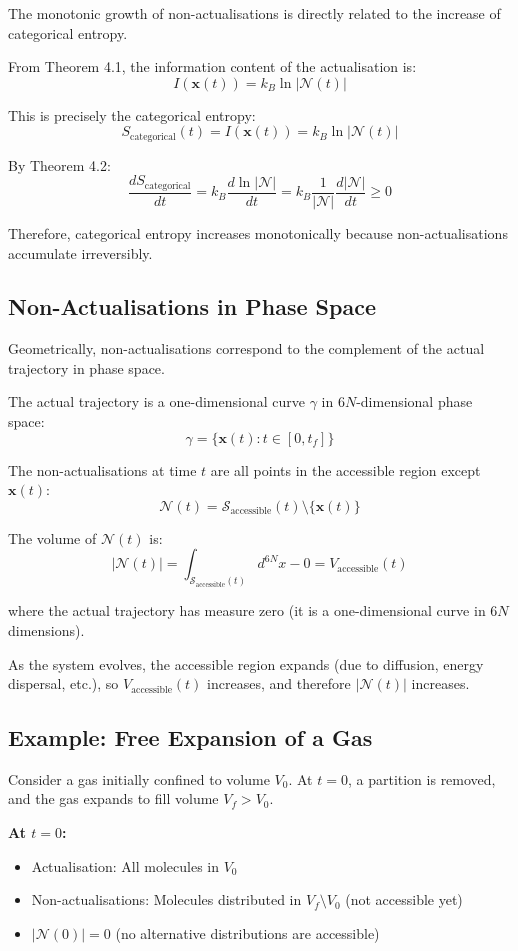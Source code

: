 \documentclass[twocolumn,10pt]{article}
\theoremstyle{definition}
\theoremstyle{remark}
\begin{document}
The monotonic growth of non-actualisations is directly related to the increase of categorical entropy.

From Theorem 4.1, the information content of the actualisation is:
$$
I(\mathbf{x}(t)) = k_B \ln |\mathcal{N}(t)|
$$

This is precisely the categorical entropy:
$$
S_{\text{categorical}}(t) = I(\mathbf{x}(t)) = k_B \ln |\mathcal{N}(t)|
$$

By Theorem 4.2:
$$
\frac{dS_{\text{categorical}}}{dt} = k_B \frac{d\ln|\mathcal{N}|}{dt} = k_B \frac{1}{|\mathcal{N}|} \frac{d|\mathcal{N}|}{dt} \geq 0
$$

Therefore, categorical entropy increases monotonically because non-actualisations accumulate irreversibly.

\subsection{Non-Actualisations in Phase Space}

Geometrically, non-actualisations correspond to the complement of the actual trajectory in phase space.

The actual trajectory is a one-dimensional curve $\gamma$ in $6N$-dimensional phase space:
$$
\gamma = \{\mathbf{x}(t) : t \in [0, t_f]\}
$$

The non-actualisations at time $t$ are all points in the accessible region except $\mathbf{x}(t)$:
$$
\mathcal{N}(t) = \mathcal{S}_{\text{accessible}}(t) \setminus \{\mathbf{x}(t)\}
$$

The volume of $\mathcal{N}(t)$ is:
$$
|\mathcal{N}(t)| = \int_{\mathcal{S}_{\text{accessible}}(t)} d^{6N}x - 0 = V_{\text{accessible}}(t)
$$

where the actual trajectory has measure zero (it is a one-dimensional curve in $6N$ dimensions).

As the system evolves, the accessible region expands (due to diffusion, energy dispersal, etc.), so $V_{\text{accessible}}(t)$ increases, and therefore $|\mathcal{N}(t)|$ increases.

\subsection{Example: Free Expansion of a Gas}

Consider a gas initially confined to volume $V_0$. At $t = 0$, a partition is removed, and the gas expands to fill volume $V_f > V_0$.

\textbf{At $t = 0$:}
\begin{itemize}
\item Actualisation: All molecules in $V_0$
\item Non-actualisations: Molecules distributed in $V_f \setminus V_0$ (not accessible yet)
\item $|\mathcal{N}(0)| = 0$ (no alternative distributions are accessible)
\end{itemize}
\end{document}
